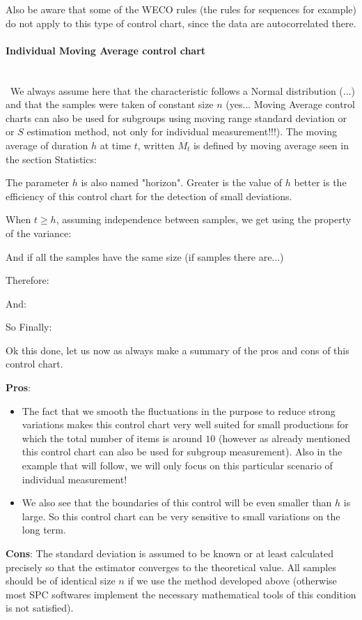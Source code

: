 	Also be aware that some of the WECO rules (the rules for sequences for example) do not apply to this type of control chart, since the data are autocorrelated there.
	
	\paragraph{Individual Moving Average control chart}\mbox{}\\\
	We always assume here that the characteristic follows a Normal distribution (...) and that the samples were taken of constant size $n$ (yes... Moving Average control charts can also be used for subgroups using moving range standard deviation or or $S$ estimation method, not only for individual measurement!!!). The moving average of duration $h$ at time $t$, written $M_t$ is defined by moving average seen in the section Statistics:
	
	The parameter $h$ is also named "horizon". Greater is the value of $h$ better is the efficiency of this control chart for the detection of small deviations.

	When $t\geq h$, assuming independence between samples, we get using the property of the variance:
	
	And if all the samples have the same size (if samples there are...)
	
	Therefore:
	 
	And:
	 	
	So Finally:
	
	Ok this done, let us now as always make a summary of the pros and cons of this control chart.
	
	\textbf{Pros}:
	\begin{itemize}
		\item The fact that we smooth the fluctuations in the purpose to reduce strong variations makes this control chart very well suited for small productions for which the total number of items is around $10$ (however as already mentioned this control chart can also be used for subgroup measurement). Also in the example that will follow, we will only focus on this particular scenario of individual measurement! 

		\item We also see that the boundaries of this control will be even smaller than $h$ is large. So this control chart can be very sensitive to small variations on the long term.
	\end{itemize}

	\textbf{Cons}:  The standard deviation is assumed to be known or at least calculated precisely so that the estimator converges to the theoretical value. All samples should be of identical size $n$ if we use the method developed above (otherwise most SPC softwares implement the necessary mathematical tools of this condition is not satisfied).
	
